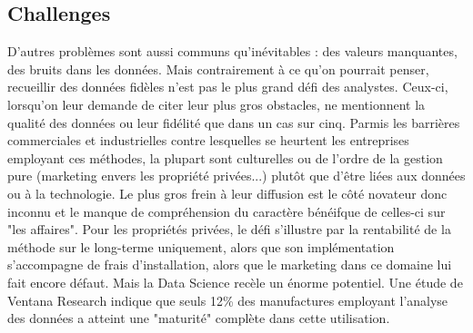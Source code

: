 \documentclass[a4paper]{article}
\begin{document}
\begin{multicols}{2}
\subsection{Challenges}
D’autres problèmes sont aussi communs qu’inévitables : des valeurs manquantes, des bruits dans les données. Mais contrairement à ce qu’on pourrait penser, recueillir des données fidèles n’est pas le plus grand défi des analystes. Ceux-ci, lorsqu’on leur demande de citer leur plus gros obstacles, ne mentionnent la qualité des données ou leur fidélité que dans un cas sur cinq. Parmis les barrières commerciales et industrielles contre lesquelles se heurtent les entreprises employant ces méthodes, la plupart sont culturelles ou de l’ordre de la gestion pure (marketing envers les propriété privées...) plutôt que d’être liées aux données ou à la technologie. Le plus gros frein à leur diffusion est le côté novateur donc inconnu et le manque de compréhension du caractère bénéifque de celles-ci sur "les affaires". Pour les propriétés privées, le défi s’illustre par la rentabilité de la méthode sur le long-terme uniquement, alors que son implémentation s’accompagne de frais d’installation, alors que le marketing dans ce domaine lui fait encore défaut. Mais la Data Science recèle un énorme potentiel. Une étude de Ventana Research indique que seuls 12\% des manufactures employant l’analyse des données a atteint une "maturité" complète dans cette utilisation.
\end{multicols}

\clearpage
\end{document}

